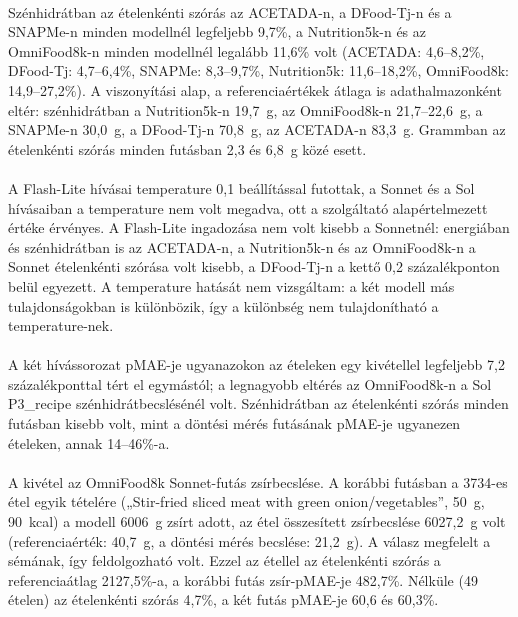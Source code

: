 \paragraph{}Szénhidrátban az ételenkénti szórás az ACETADA-n, a DFood-Tj-n és a 
SNAPMe-n minden modellnél legfeljebb 9,7\%, a Nutrition5k-n és az OmniFood8k-n minden 
modellnél legalább 11,6\% volt (ACETADA: 4,6--8,2\%, DFood-Tj: 4,7--6,4\%, SNAPMe: 
8,3--9,7\%, Nutrition5k: 11,6--18,2\%, OmniFood8k: 14,9--27,2\%). A viszonyítási alap, a 
referenciaértékek átlaga is adathalmazonként eltér: szénhidrátban a Nutrition5k-n 
19,7~g, az OmniFood8k-n 21,7--22,6~g, a SNAPMe-n 30,0~g, a DFood-Tj-n 70,8~g, az 
ACETADA-n 83,3~g. Grammban az ételenkénti szórás minden futásban 2,3 és 6,8~g közé esett.

\paragraph{}A Flash-Lite hívásai temperature 0,1 beállítással futottak, a Sonnet és a Sol 
hívásaiban a temperature nem volt megadva, ott a szolgáltató alapértelmezett értéke 
érvényes. A Flash-Lite ingadozása nem volt kisebb a Sonnetnél: energiában és 
szénhidrátban is az ACETADA-n, a Nutrition5k-n és az OmniFood8k-n a Sonnet ételenkénti 
szórása volt kisebb, a DFood-Tj-n a kettő 0,2 százalékponton belül egyezett. A 
temperature hatását nem vizsgáltam: a két modell más tulajdonságokban is különbözik, így 
a különbség nem tulajdonítható a temperature-nek.

\paragraph{}A két hívássorozat pMAE-je ugyanazokon az ételeken egy kivétellel legfeljebb 
7,2 százalékponttal tért el egymástól; a legnagyobb eltérés az OmniFood8k-n a Sol 
P3\_recipe szénhidrátbecslésénél volt. 
Szénhidrátban az ételenkénti szórás minden futásban kisebb volt, mint a döntési mérés 
futásának pMAE-je ugyanezen ételeken, annak 14--46\%-a.

\paragraph{}A kivétel az OmniFood8k Sonnet-futás zsírbecslése. A korábbi futásban a 
3734-es étel egyik tételére („Stir-fried sliced meat with green onion/vegetables”, 
50~g, 90~kcal) a modell 6006~g zsírt adott, az étel összesített zsírbecslése 6027,2~g 
volt (referenciaérték: 40,7~g, a döntési mérés becslése: 21,2~g). A válasz megfelelt a 
sémának, így feldolgozható volt. Ezzel az étellel az ételenkénti szórás a 
referenciaátlag 2127,5\%-a, a korábbi futás zsír-pMAE-je 482,7\%. Nélküle 
(49 ételen) az ételenkénti szórás 4,7\%, a két futás pMAE-je 60,6 és 60,3\%.

